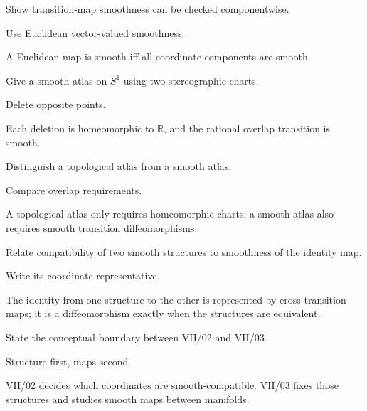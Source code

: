 \begin{exercise}\label{exr:vii02-20}
Show transition-map smoothness can be checked componentwise.
\end{exercise}
\begin{hint}
Use Euclidean vector-valued smoothness.
\end{hint}
\begin{solution}
A Euclidean map is smooth iff all coordinate components are smooth.
\end{solution}

\begin{exercise}\label{exr:vii02-21}
Give a smooth atlas on \(S^1\) using two stereographic charts.
\end{exercise}
\begin{hint}
Delete opposite points.
\end{hint}
\begin{solution}
Each deletion is homeomorphic to \(\mathbb R\), and the rational overlap transition is smooth.
\end{solution}

\begin{exercise}\label{exr:vii02-22}
Distinguish a topological atlas from a smooth atlas.
\end{exercise}
\begin{hint}
Compare overlap requirements.
\end{hint}
\begin{solution}
A topological atlas only requires homeomorphic charts; a smooth atlas also requires smooth transition diffeomorphisms.
\end{solution}

\begin{exercise}\label{exr:vii02-23}
Relate compatibility of two smooth structures to smoothness of the identity map.
\end{exercise}
\begin{hint}
Write its coordinate representative.
\end{hint}
\begin{solution}
The identity from one structure to the other is represented by cross-transition maps; it is a diffeomorphism exactly when the structures are equivalent.
\end{solution}

\begin{exercise}\label{exr:vii02-24}
State the conceptual boundary between VII/02 and VII/03.
\end{exercise}
\begin{hint}
Structure first, maps second.
\end{hint}
\begin{solution}
VII/02 decides which coordinates are smooth-compatible. VII/03 fixes those structures and studies smooth maps between manifolds.
\end{solution}

